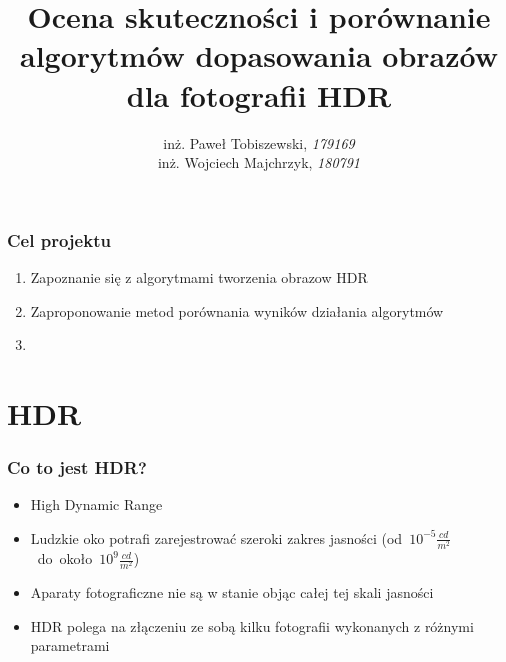 \documentclass{beamer}
\title{Ocena skuteczności i porównanie algorytmów dopasowania obrazów dla fotografii HDR}
\author[]{inż. Paweł Tobiszewski, \emph{179169}\\inż. Wojciech Majchrzyk, \emph{180791}}
\institute[PWr]{Politechnika Wrocławska, Wydział Informatyki i Zarządzania}
\begin{document}
\begin{frame}
	\titlepage
\end{frame}


\begin{frame}
	\frametitle{Cel projektu}
	\begin{enumerate}
		\item Zapoznanie się z algorytmami tworzenia obrazow HDR
		\item Zaproponowanie metod porównania wyników działania algorytmów
		\item 
	\end{enumerate}
\end{frame}

\section{HDR}
\begin{frame}
	\frametitle{Co to jest HDR?}
	\begin{itemize}
		\item High Dynamic Range
		\item Ludzkie oko potrafi zarejestrować szeroki zakres jasności (od~$10^{-5}\frac{cd}{m^2}$~do~około~$10^9\frac{cd}{m^2}$)
		\item Aparaty fotograficzne nie są w stanie objąc całej tej skali jasności
		\item HDR polega na złączeniu ze sobą kilku fotografii wykonanych z różnymi parametrami
	\end{itemize}
\end{frame}
\end{document}

